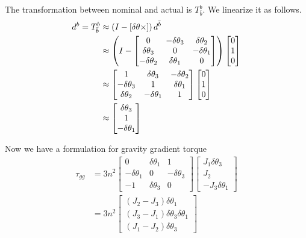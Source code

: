 \documentclass[]{article}
\begin{document}
The transformation between nominal and actual is $T_{\bar{b}}^b$. We linearize it as follows.
\begin{align}
	d^b = T_{\bar{b}}^b & \approx \left(I - \left[ \delta \theta \times \right]\right) d^{\bar{b}} \\
	& \approx \left(I - \begin{bmatrix}
		0 & -\delta \theta_3 & \delta \theta_2 \\
		\delta \theta_3 & 0 & -\delta \theta_1 \\
		-\delta \theta_2 & \delta \theta_1 & 0
	\end{bmatrix}\right) \begin{bmatrix}
	0 \\
	1 \\
	0
\end{bmatrix} \\
& \approx  \begin{bmatrix}
	1 & \delta \theta_3 & -\delta \theta_2 \\
	-\delta \theta_3 & 1 & \delta \theta_1 \\
	\delta \theta_2 & -\delta \theta_1 & 1
\end{bmatrix} \begin{bmatrix}
	0 \\
	1 \\
	0
\end{bmatrix} \\
& \approx \begin{bmatrix}
	\delta \theta_3 \\
	1 \\
	- \delta \theta_1
\end{bmatrix}
\end{align}

Now we have a formulation for gravity gradient torque
\begin{align}
	\tau_{gg} & = 3 n^2 \begin{bmatrix}
		0 & \delta \theta_1 & 1 \\
		-\delta \theta_1 & 0 & -\delta \theta_3 \\
		-1 & \delta \theta_3 & 0 
	\end{bmatrix} \begin{bmatrix}
	J_1 \delta \theta_3 \\
	J_2 \\
	-J_3 \delta \theta_1
\end{bmatrix} \\
& = 3 n^2 \begin{bmatrix}
	(J_2 - J_3) \delta \theta_1 \\
	(J_3 - J_1) \delta \theta_3 \delta \theta_1 \\
	(J_1 - J_2) \delta \theta_3
\end{bmatrix}
\end{align}
\end{document}
